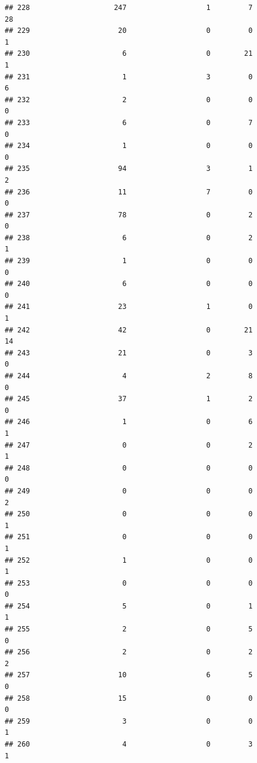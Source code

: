 \documentclass[
]{article}
\begin{document}
\begin{verbatim}
## 228                    247                   1         7                 28
## 229                     20                   0         0                  1
## 230                      6                   0        21                  1
## 231                      1                   3         0                  6
## 232                      2                   0         0                  0
## 233                      6                   0         7                  0
## 234                      1                   0         0                  0
## 235                     94                   3         1                  2
## 236                     11                   7         0                  0
## 237                     78                   0         2                  0
## 238                      6                   0         2                  1
## 239                      1                   0         0                  0
## 240                      6                   0         0                  0
## 241                     23                   1         0                  1
## 242                     42                   0        21                 14
## 243                     21                   0         3                  0
## 244                      4                   2         8                  0
## 245                     37                   1         2                  0
## 246                      1                   0         6                  1
## 247                      0                   0         2                  1
## 248                      0                   0         0                  0
## 249                      0                   0         0                  2
## 250                      0                   0         0                  1
## 251                      0                   0         0                  1
## 252                      1                   0         0                  1
## 253                      0                   0         0                  0
## 254                      5                   0         1                  1
## 255                      2                   0         5                  0
## 256                      2                   0         2                  2
## 257                     10                   6         5                  0
## 258                     15                   0         0                  0
## 259                      3                   0         0                  1
## 260                      4                   0         3                  1

\end{verbatim}
\end{document}

